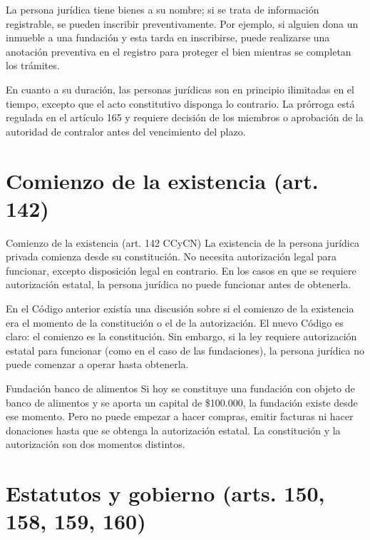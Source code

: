 \documentclass[12pt,oneside]{book}
\begin{document}
La persona jurídica tiene bienes a su nombre; si se trata de información registrable, se pueden inscribir preventivamente. Por ejemplo, si alguien dona un inmueble a una fundación y esta tarda en inscribirse, puede realizarse una anotación preventiva en el registro para proteger el bien mientras se completan los trámites.

\begin{note}
En cuanto a su duración, las personas jurídicas son en principio ilimitadas en el tiempo, excepto que el acto constitutivo disponga lo contrario. La prórroga está regulada en el artículo 165 y requiere decisión de los miembros o aprobación de la autoridad de contralor antes del vencimiento del plazo.
\end{note}

\section{Comienzo de la existencia (art. 142)}

\begin{definition}{Comienzo de la existencia (art. 142 CCyCN)}
La existencia de la persona jurídica privada comienza desde su constitución. No necesita autorización legal para funcionar, excepto disposición legal en contrario. En los casos en que se requiere autorización estatal, la persona jurídica no puede funcionar antes de obtenerla.
\end{definition}

En el Código anterior existía una discusión sobre si el comienzo de la existencia era el momento de la constitución o el de la autorización. El nuevo Código es claro: el comienzo es la constitución. Sin embargo, si la ley requiere autorización estatal para funcionar (como en el caso de las fundaciones), la persona jurídica no puede comenzar a operar hasta obtenerla.

\begin{example}{Fundación banco de alimentos}
Si hoy se constituye una fundación con objeto de banco de alimentos y se aporta un capital de \$100.000, la fundación existe desde ese momento. Pero no puede empezar a hacer compras, emitir facturas ni hacer donaciones hasta que se obtenga la autorización estatal. La constitución y la autorización son dos momentos distintos.
\end{example}

\section{Estatutos y gobierno (arts. 150, 158, 159, 160)}
\end{document}
